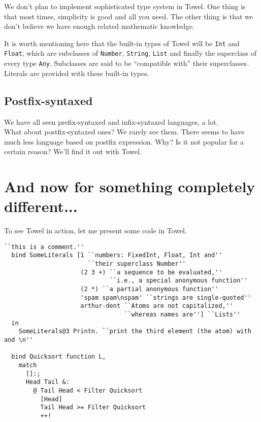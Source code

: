 \documentclass{article}
\begin{document}
We don't plan to implement sophisticated type system in Towel. One thing is that most times, simplicity is good and all you need. The other thing is that we don't believe we have enough related mathematic knowledge.

It is worth mentioning here that the built-in types of Towel will be \texttt{Int} and \texttt{Float}, which are subclasses of \texttt{Number},
\texttt{String}, \texttt{List} and finally the superclass of every type \texttt{Any}. Subclasses are said to be ``compatible with'' their superclasses.\\

Literals are provided with these built-in types.

\subsection{Postfix-syntaxed}

We have all seen prefix-syntaxed and infix-syntaxed languages, a lot.\\

What about postfix-syntaxed ones? We rarely see them. There seems to have much less language based on postfix expression. Why? Is it not popular for a certain reason? We'll find it out with Towel.

\section{And now for something completely different...}

To see Towel in action, let me present some code in Towel.

\begin{Verbatim}[samepage=true]
  ``this is a comment.''
  bind SomeLiterals [1 ``numbers: FixedInt, Float, Int and''
                       ``their superclass Number''
                     (2 3 +) ``a sequence to be evaluated,''
                             ``i.e., a special anonymous function''
                     (2 *) ``a partial anonymous function''
                     'spam spam\nspam' ``strings are single-quoted''
                     arthur-dent ``Atoms are not capitalized,''
                                 ``whereas names are''] ``Lists''
  in
    SomeLiterals@3 Printn. ``print the third element (the atom) with and \n''

  bind Quicksort function L,
    match
      []:;
      Head Tail &:
        @ Tail Head < Filter Quicksort
          [Head]
          Tail Head >= Filter Quicksort
          ++!
\end{Verbatim}
\end{document}
